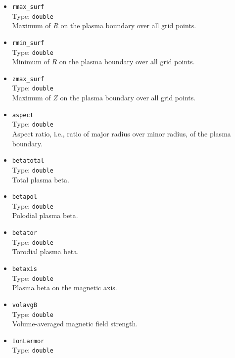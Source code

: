 \begin{itemize}
       and then asking what magnetic field at the radius of the magnetic axis at $\varphi=0$ this would create.
       Because the quantity is divided by $R$ at $\varphi = 0$,
       it is not a toroidal average and should not be used when, e.g., scaling equilibria based on magnetic field strength
       \footnote{Thanks to Damien Huet for stressing this important point.}.
 \item \texttt{rmax\_surf} \\
       Type: \texttt{double} \\
       Maximum of $R$ on the plasma boundary over all grid points.
 \item \texttt{rmin\_surf} \\
       Type: \texttt{double} \\
       Minimum of $R$ on the plasma boundary over all grid points.
 \item \texttt{zmax\_surf} \\
       Type: \texttt{double} \\
       Maximum of $Z$ on the plasma boundary over all grid points.
 \item \texttt{aspect} \\
       Type: \texttt{double} \\
       Aspect ratio, i.e., ratio of major radius over minor radius, of the plasma boundary.
 \item \texttt{betatotal} \\
       Type: \texttt{double} \\
       Total plasma beta.
 \item \texttt{betapol} \\
       Type: \texttt{double} \\
       Polodial plasma beta.
 \item \texttt{betator} \\
       Type: \texttt{double} \\
       Torodial plasma beta.
 \item \texttt{betaxis} \\
       Type: \texttt{double} \\
       Plasma beta on the magnetic axis.
 \item \texttt{volavgB} \\
       Type: \texttt{double} \\
       Volume-averaged magnetic field strength.
 \item \texttt{IonLarmor} \\
       Type: \texttt{double} \\

\end{itemize}
